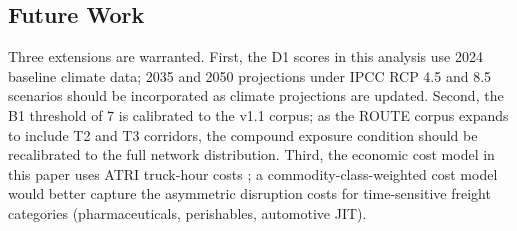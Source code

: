 \subsection*{Future Work}

Three extensions are warranted. First, the D1 scores in this analysis use 2024 baseline climate data; 2035 and 2050 projections under IPCC RCP 4.5 and 8.5 scenarios should be incorporated as climate projections are updated. Second, the B1 threshold of 7 is calibrated to the v1.1 corpus; as the ROUTE corpus expands to include T2 and T3 corridors, the compound exposure condition should be recalibrated to the full network distribution. Third, the economic cost model in this paper uses ATRI truck-hour costs \citep{ATRI_costs2024}; a commodity-class-weighted cost model would better capture the asymmetric disruption costs for time-sensitive freight categories (pharmaceuticals, perishables, automotive JIT).
